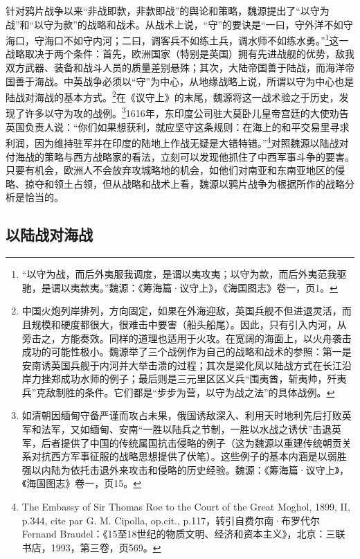 \documentclass[a4paper, 12pt, openright]{ctexbook}
\begin{document}
针对鸦片战争以来“非战即款，非款即战”的舆论和策略，魏源提出了“以守为战”和“以守为款”的战略和战术。从战术上说，“守”的要诀是“一曰，守外洋不如守海口，守海口不如守内河；二曰，调客兵不如练土兵，调水师不如练水勇。”\footnote{“以守为战，而后外夷服我调度，是谓以夷攻夷；以守为款，而后外夷范我驱驰，是谓以夷款夷。”魏源：《筹海篇·议守上》，《海国图志》卷一，页1。}这一战略取决于两个条件：首先，欧洲国家（特别是英国）拥有先进战舰的优势，敌我双方武器、装备和战斗人员的质量差别悬殊；其次，大陆帝国善于陆战，而海洋帝国善于海战。中英战争必须以“守”为中心，从地缘战略上说，所谓以守为中心也是陆战对海战的基本方式。\footnote{中国火炮列岸排列，方向固定，如果在外海迎敌，英国兵舰不但进退灵活，而且规模和硬度都很大，很难击中要害（船头船尾）。因此，只有引入内河，从旁击之，方能奏效。同样的道理也适用于火攻。在宽阔的海面上，以火舟袭击成功的可能性极小。魏源举了三个战例作为自己的战略和战术的参照：第一是安南诱英国兵舰于内河并大举击溃的过程；其次是梁化凤以陆战方式在长江沿岸力挫郑成功水师的例子；最后则是三元里区区义兵“围夷酋，斩夷帅，歼夷兵”克敌制胜的条件。它们都是“步步为营，以守为战之法”的具体战例。}在《议守上》的末尾，魏源将这一战术验之于历史，发现了许多以守为攻的战例。\footnote{如清朝因缅甸守备严谨而攻占未果，俄国诱敌深入、利用天时地利先后打败英军和法军，又如缅甸、安南“一胜以陆兵之节制，一胜以水战之诱伏”击退英军，后者提供了中国的传统属国抗击侵略的例子（这为魏源以重建传统朝贡关系对抗西方军事征服的战略思想提供了伏笔）。这些例子的基本内涵是以弱胜强以内陆为依托击退外来攻击和侵略的历史经验。魏源：《筹海篇·议守上》，《海国图志》卷一，页15。}1616年，东印度公司驻大莫卧儿皇帝宫廷的大使劝告英国负责人说：“你们如果想获利，就应坚守这条规则：在海上的和平交易里寻求利润，因为维持驻军并在印度的陆地上作战无疑是大错特错。”\footnote{The Embassy of Sir Thomas Roe to the Court of the Great Moghol, 1899, II, p.344, cite par G. M. Cipolla, op.cit., p.117，转引自费尔南·布罗代尔Fernand Braudel：《15至18世纪的物质文明、经济和资本主义》，北京：三联书店，1993，第三卷，页569。}对照魏源以陆战对付海战的策略与西方战略家的看法，立刻可以发现他抓住了中西军事斗争的要害。只要有机会，欧洲人不会放弃攻城略地的机会，如他们对南亚和东南亚地区的侵略、掠夺和领土占领，但从战略和战术上看，魏源以鸦片战争为根据所作的战略分析是恰当的。

\subsection{以陆战对海战}
\end{document}
